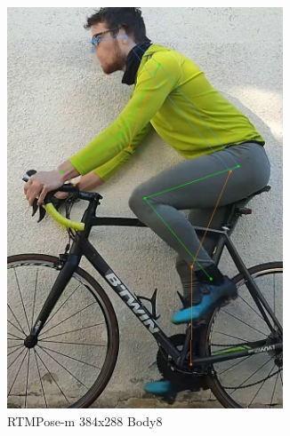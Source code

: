 \def\imgwidth{0.45\textwidth}
\def\smallimgwidth{0.9\textwidth}

\begin{figure}[htbp]
    \centering
    \begin{subfigure}[b]{\imgwidth}
        \centering

        \includegraphics[width=\smallimgwidth]{obrazky-figures/rtmpose-m_8xb256-420e_body8-384x288_zlute_196_crop.jpg}
        \caption{RTMPose-m 384x288 Body8}

    \end{subfigure}
    \hfill
    \begin{subfigure}[b]{\imgwidth}
        \centering


\end{subfigure}
\end{figure}
